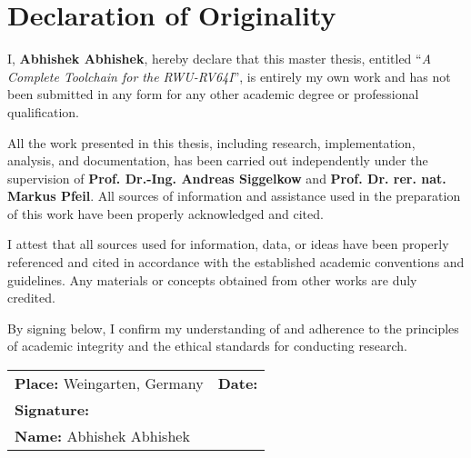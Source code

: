 \chapter*{Declaration of Originality}

I, \textbf{Abhishek Abhishek}, hereby declare that this master thesis, entitled “\textit{A Complete Toolchain for the RWU-RV64I}”, is entirely my own work and has not been submitted in any form for any other academic degree or professional qualification.

All the work presented in this thesis, including research, implementation, analysis, and documentation, has been carried out independently under the supervision of \textbf{Prof. Dr.-Ing. Andreas Siggelkow} and \textbf{Prof. Dr. rer. nat. Markus Pfeil}.  
All sources of information and assistance used in the preparation of this work have been properly acknowledged and cited.

\medskip

I attest that all sources used for information, data, or ideas have been properly referenced and cited in accordance with the established academic conventions and guidelines. Any materials or concepts obtained from other works are duly credited.

\medskip

By signing below, I confirm my understanding of and adherence to the principles of academic integrity and the ethical standards for conducting research.

\vspace{2cm}

\noindent
\begin{tabular}{@{}p{}p{}@{}}
\textbf{Place:} Weingarten, Germany & \hspace{3.0cm}\textbf{Date:} \\
\textbf{Signature:} & \\[0.5cm]
\textbf{Name:} Abhishek Abhishek &
\end{tabular}

